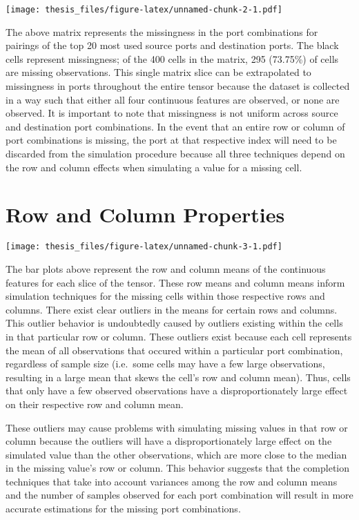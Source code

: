 \documentclass[12pt,twoside]{dukestatscithesis}
\theoremstyle{definition}
\theoremstyle{definition}
\theoremstyle{definition}
\theoremstyle{remark}
\begin{document}
\texttt{[image: thesis\_files/figure-latex/unnamed-chunk-2-1.pdf]}

The above matrix represents the missingness in the port combinations for
pairings of the top 20 most used source ports and destination ports. The
black cells represent missingness; of the 400 cells in the matrix, 295
(73.75\%) of cells are missing observations. This single matrix slice
can be extrapolated to missingness in ports throughout the entire tensor
because the dataset is collected in a way such that either all four
continuous features are observed, or none are observed. It is important
to note that missingness is not uniform across source and destination
port combinations. In the event that an entire row or column of port
combinations is missing, the port at that respective index will need to
be discarded from the simulation procedure because all three techniques
depend on the row and column effects when simulating a value for a
missing cell.

\section{Row and Column Properties}\label{row-and-column-properties}

\texttt{[image: thesis\_files/figure-latex/unnamed-chunk-3-1.pdf]}

The bar plots above represent the row and column means of the continuous
features for each slice of the tensor. These row means and column means
inform simulation techniques for the missing cells within those
respective rows and columns. There exist clear outliers in the means for
certain rows and columns. This outlier behavior is undoubtedly caused by
outliers existing within the cells in that particular row or column.
These outliers exist because each cell represents the mean of all
observations that occured within a particular port combination,
regardless of sample size (i.e.~some cells may have a few large
observations, resulting in a large mean that skews the cell's row and
column mean). Thus, cells that only have a few observed observations
have a disproportionately large effect on their respective row and
column mean.

These outliers may cause problems with simulating missing values in that
row or column because the outliers will have a disproportionately large
effect on the simulated value than the other observations, which are
more close to the median in the missing value's row or column. This
behavior suggests that the completion techniques that take into account
variances among the row and column means and the number of samples
observed for each port combination will result in more accurate
estimations for the missing port combinations.
\end{document}
